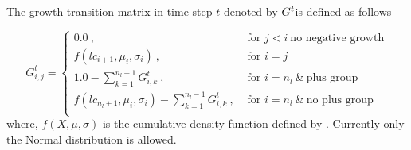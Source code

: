 The growth transition matrix in time step \(t\) denoted by \(\boldmath{G^t}\)is defined as follows

\begin{equation}
G^t_{i,j} = 
\begin{cases}
0.0 \ , & \text{ for } j < i \ \text{no negative growth}\\
f(lc_{i + 1},\mu_i, \sigma_i) \ , & \text{ for } i = j \\
1.0 - \sum\limits_{k = 1}^{n_l - 1}G^t_{i,k} \ , & \text{ for } i = n_l \ \& \ \text{plus group} \\
f(lc_{n_l + 1},\mu_i, \sigma_i) - \sum\limits_{k = 1}^{n_l - 1}G^t_{i,k} \ , & \text{ for } i = n_l \ \&  \  \text{no plus group} \\		
\end{cases}
\end{equation}
where, \(f(X,\mu, \sigma)\) is the cumulative density function defined by . Currently only the Normal distribution is allowed.

